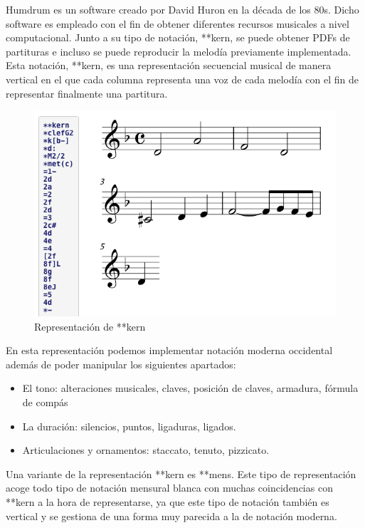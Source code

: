 \documentclass{article}
\begin{document}
    Humdrum\cite{humdrum} es un software creado por David Huron en la década de los 80s. Dicho software es empleado con el fin de obtener
    diferentes recursos musicales a nivel computacional. Junto a su tipo de notación, **kern, se puede obtener PDFs de partituras
    e incluso se puede reproducir la melodía previamente implementada. Esta notación, **kern, es una representación secuencial musical de manera vertical
    en el que cada columna representa una voz de cada melodía con el fin de representar finalmente una partitura.

    \begin{figure}[H]
        \includegraphics[scale=0.45]{imagesMem/humdrum.png}
        \caption{Representación de **kern}
    \end{figure}

    En esta representación podemos implementar notación moderna occidental además de poder manipular los siguientes apartados:

    \begin{itemize}
        \item El tono: alteraciones musicales, claves, posición de claves, armadura, fórmula de compás
        \item La duración: silencios, puntos, ligaduras, ligados.
        \item Articulaciones y ornamentos: staccato, tenuto, pizzicato.
    \end{itemize}

    Una variante de la representación **kern es **mens. Este tipo de representación acoge todo tipo de notación mensural blanca
    con muchas coincidencias con **kern a la hora de representarse, ya que este tipo de notación también es vertical y se gestiona
    de una forma muy parecida a la de notación moderna.
\end{document}
